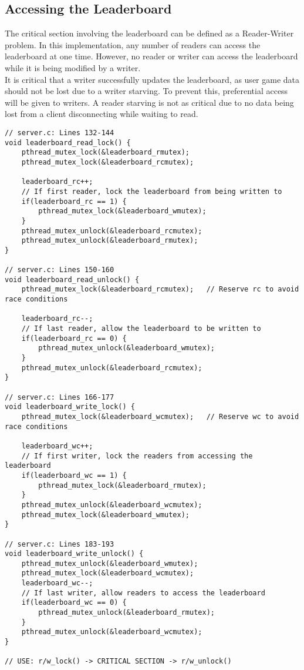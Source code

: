 \subsection{Accessing the Leaderboard}
The critical section involving the leaderboard can be defined as a Reader-Writer problem. In this implementation, any number of readers can access the leaderboard at one time. However, no reader or writer can access the leaderboard while it is being modified by a writer. 
\\
It is critical that a writer successfully updates the leaderboard, as user game data should not be lost due to a writer starving. To prevent this, preferential access will be given to writers. A reader starving is not as critical due to no data being lost from a client disconnecting while waiting to read. 
\begin{lstlisting}[style=CStyle]
// server.c: Lines 132-144
void leaderboard_read_lock() {
	pthread_mutex_lock(&leaderboard_rmutex);   
	pthread_mutex_lock(&leaderboard_rcmutex);
	
	leaderboard_rc++;
	// If first reader, lock the leaderboard from being written to
	if(leaderboard_rc == 1) {
		pthread_mutex_lock(&leaderboard_wmutex);    
	}
	pthread_mutex_unlock(&leaderboard_rcmutex);
	pthread_mutex_unlock(&leaderboard_rmutex);
}

// server.c: Lines 150-160
void leaderboard_read_unlock() {
	pthread_mutex_lock(&leaderboard_rcmutex);   // Reserve rc to avoid race conditions
	
	leaderboard_rc--;
	// If last reader, allow the leaderboard to be written to
	if(leaderboard_rc == 0) {
		pthread_mutex_unlock(&leaderboard_wmutex);
	}
	pthread_mutex_unlock(&leaderboard_rcmutex);
}

// server.c: Lines 166-177
void leaderboard_write_lock() {
	pthread_mutex_lock(&leaderboard_wcmutex);   // Reserve wc to avoid race conditions
	
	leaderboard_wc++;
	// If first writer, lock the readers from accessing the leaderboard
	if(leaderboard_wc == 1) {
		pthread_mutex_lock(&leaderboard_rmutex);
	}
	pthread_mutex_unlock(&leaderboard_wcmutex);
	pthread_mutex_lock(&leaderboard_wmutex);   
}

// server.c: Lines 183-193
void leaderboard_write_unlock() {
	pthread_mutex_unlock(&leaderboard_wmutex);  	
	pthread_mutex_lock(&leaderboard_wcmutex);
	leaderboard_wc--;
	// If last writer, allow readers to access the leaderboard
	if(leaderboard_wc == 0) {
		pthread_mutex_unlock(&leaderboard_rmutex);
	}
	pthread_mutex_unlock(&leaderboard_wcmutex);
}

// USE: r/w_lock() -> CRITICAL SECTION -> r/w_unlock()
\end{lstlisting}